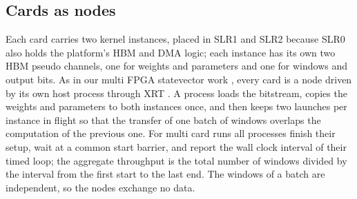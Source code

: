 \subsection{Cards as nodes}

Each card carries two kernel instances, placed in SLR1 and SLR2 because SLR0 also holds the platform's HBM and DMA
logic; each instance has its own two HBM pseudo channels, one for weights and parameters and one for windows and
output bits. As in our multi FPGA statevector work \cite{ali2026multifpga}, every card is a node driven by its own host
process through XRT \cite{amd_xrt}. A process loads the bitstream, copies the weights and parameters to both
instances once, and then keeps two launches per instance in flight so that the transfer of one batch of windows
overlaps the computation of the previous one. For multi card runs all processes finish their setup, wait at a common
start barrier, and report the wall clock interval of their timed loop; the aggregate throughput is the total number of
windows divided by the interval from the first start to the last end. The windows of a batch are independent, so the
nodes exchange no data.
